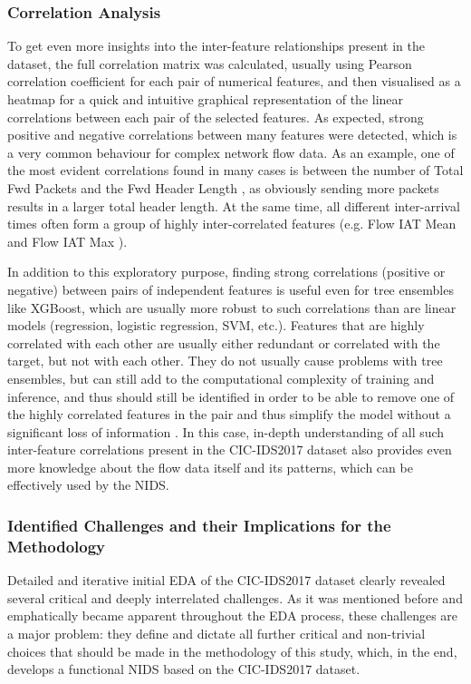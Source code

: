 \subsubsection{Correlation Analysis} 
To get even more insights into the inter-feature relationships present in the dataset, the full correlation matrix was calculated, usually using Pearson correlation coefficient for each pair of numerical features, and then visualised as a heatmap for a quick and intuitive graphical representation of the linear correlations between each pair of the selected features. As expected, strong positive and negative correlations between many features were detected, which is a very common behaviour for complex network flow data. As an example, one of the most evident correlations found in many cases is between the number of Total Fwd Packets and the Fwd Header Length , as obviously sending more packets results in a larger total header length. At the same time, all different inter-arrival times often form a group of highly inter-correlated features (e.g. Flow IAT Mean and Flow IAT Max ). 

In addition to this exploratory purpose, finding strong correlations (positive or negative) between pairs of independent features is useful even for tree ensembles like XGBoost, which are usually more robust to such correlations than are linear models (regression, logistic regression, SVM, etc.). Features that are highly correlated with each other are usually either redundant or correlated with the target, but not with each other. They do not usually cause problems with tree ensembles, but can still add to the computational complexity of training and inference, and thus should still be identified in order to be able to remove one of the highly correlated features in the pair and thus simplify the model without a significant loss of information \parencite{habeeb2024two}. In this case, in-depth understanding of all such inter-feature correlations present in the CIC-IDS2017 dataset also provides even more knowledge about the flow data itself and its patterns, which can be effectively used by the NIDS.

\subsubsection{Identified Challenges and their Implications for the Methodology}
Detailed and iterative initial EDA of the CIC-IDS2017 dataset clearly revealed several critical and deeply interrelated challenges. As it was mentioned before and emphatically became apparent throughout the EDA process, these challenges are a major problem: they define and dictate all further critical and non-trivial choices that should be made in the methodology of this study, which, in the end, develops a functional NIDS based on the CIC-IDS2017 dataset.

